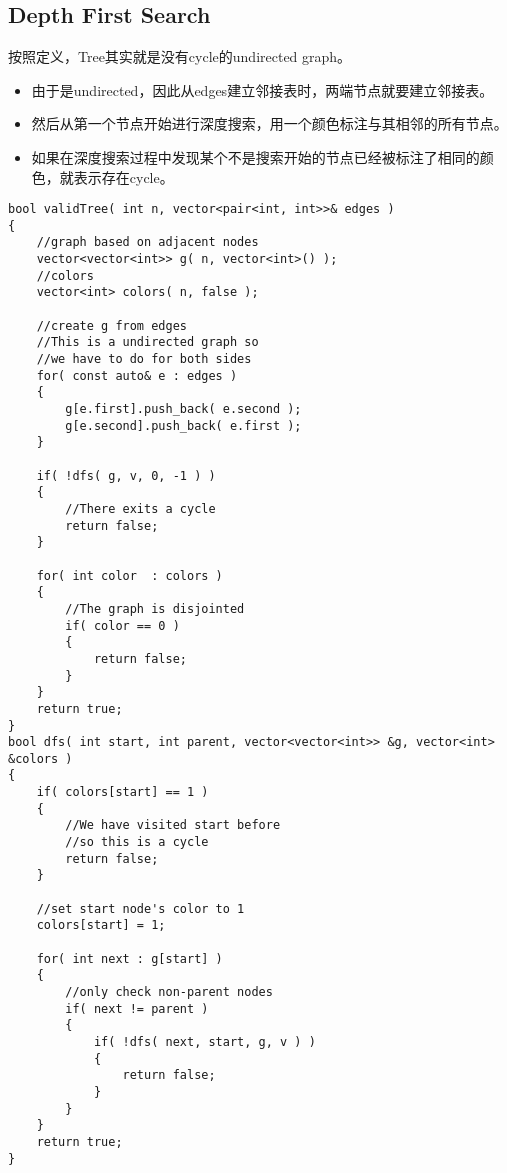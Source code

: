 \subsection{Depth First Search}
按照定义，Tree其实就是没有cycle的undirected graph。
\begin{itemize}
\item 由于是undirected，因此从edges建立邻接表时，两端节点就要建立邻接表。
\item 然后从第一个节点开始进行深度搜索，用一个颜色标注与其相邻的所有节点。
\item 如果在深度搜索过程中发现某个不是搜索开始的节点已经被标注了相同的颜色，就表示存在cycle。
\end{itemize}
\setcounter{lstlisting}{0}
\begin{lstlisting}[style=customc, caption={DFS}]
bool validTree( int n, vector<pair<int, int>>& edges )
{
    //graph based on adjacent nodes
    vector<vector<int>> g( n, vector<int>() );
    //colors
    vector<int> colors( n, false );

    //create g from edges
    //This is a undirected graph so
    //we have to do for both sides
    for( const auto& e : edges )
    {
        g[e.first].push_back( e.second );
        g[e.second].push_back( e.first );
    }

    if( !dfs( g, v, 0, -1 ) )
    {
        //There exits a cycle
        return false;
    }

    for( int color  : colors )
    {
        //The graph is disjointed
        if( color == 0 )
        {
            return false;
        }
    }
    return true;
}
bool dfs( int start, int parent, vector<vector<int>> &g, vector<int> &colors )
{
    if( colors[start] == 1 )
    {
        //We have visited start before
        //so this is a cycle
        return false;
    }

    //set start node's color to 1
    colors[start] = 1;

    for( int next : g[start] )
    {
        //only check non-parent nodes
        if( next != parent )
        {
            if( !dfs( next, start, g, v ) )
            {
                return false;
            }
        }
    }
    return true;
}

\end{lstlisting}
